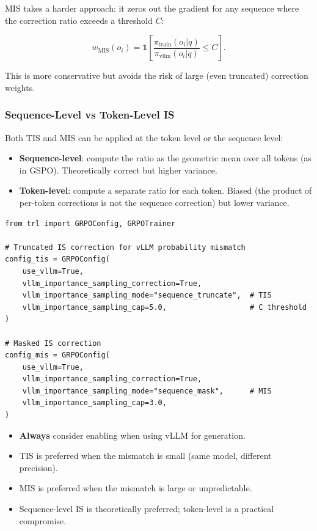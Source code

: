 MIS takes a harder approach: it zeros out the gradient for any sequence where the correction ratio exceeds a threshold $C$:

\[
w_{\text{MIS}}(o_i) = \mathbf{1}\!\left[\frac{\pi_{\text{train}}(o_i|q)}{\pi_{\text{vllm}}(o_i|q)} \le C\right].
\]

This is more conservative but avoids the risk of large (even truncated) correction weights.

\subsubsection*{Sequence-Level vs Token-Level IS}
\label{sequence-level-vs-token-level-is}

Both TIS and MIS can be applied at the token level or the sequence level:

\begin{itemize}
  \item \textbf{Sequence-level}: compute the ratio as the geometric mean over all tokens (as in GSPO). Theoretically correct but higher variance.
  \item \textbf{Token-level}: compute a separate ratio for each token. Biased (the product of per-token corrections is not the sequence correction) but lower variance.
\end{itemize}

\begin{examplebox}
\begin{lstlisting}[style=pythonstyle]
from trl import GRPOConfig, GRPOTrainer

# Truncated IS correction for vLLM probability mismatch
config_tis = GRPOConfig(
    use_vllm=True,
    vllm_importance_sampling_correction=True,
    vllm_importance_sampling_mode="sequence_truncate",  # TIS
    vllm_importance_sampling_cap=5.0,                   # C threshold
)

# Masked IS correction
config_mis = GRPOConfig(
    use_vllm=True,
    vllm_importance_sampling_correction=True,
    vllm_importance_sampling_mode="sequence_mask",      # MIS
    vllm_importance_sampling_cap=3.0,
)
\end{lstlisting}
\end{examplebox}

\begin{keybox}
\begin{itemize}
  \item \textbf{Always} consider enabling when using vLLM for generation.
  \item TIS is preferred when the mismatch is small (same model, different precision).
  \item MIS is preferred when the mismatch is large or unpredictable.
  \item Sequence-level IS is theoretically preferred; token-level is a practical compromise.
\end{itemize}
\end{keybox}


